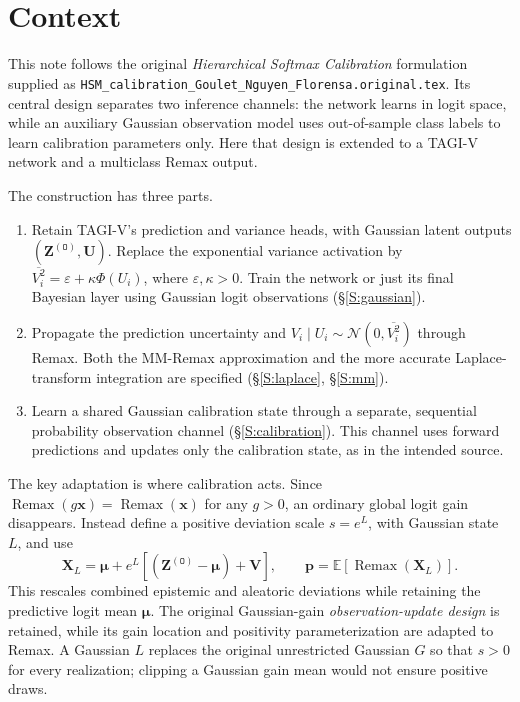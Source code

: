 \documentclass[letterpaper]{article}
\newcommand{\E}{\mathbb E}
\newcommand{\Normal}{\mathcal N}
\newcommand{\Remax}{\operatorname{Remax}}
\newcommand{\vbari}{\overline{V_i^2}}
\newcommand{\given}{\mid}
\newcommand{\titleS}{~}
\begin{document}
\title{\titleS}
\section{Context}\label{S:scope}
This note follows the original \emph{Hierarchical Softmax Calibration} formulation supplied as \nolinkurl{HSM_calibration_Goulet_Nguyen_Florensa.original.tex}. Its central design separates two inference channels: the network learns in logit space, while an auxiliary Gaussian observation model uses out-of-sample class labels to learn calibration parameters only. Here that design is extended to a TAGI-V network and a multiclass Remax output.

The construction has three parts.
\begin{enumerate}
\item Retain TAGI-V's prediction and variance heads, with Gaussian latent outputs $(\bm Z^{(\mathtt O)},\bm U)$. Replace the exponential variance activation by $\vbari=\varepsilon+\kappa\Phi(U_i)$, where $\varepsilon,\kappa>0$. Train the network or just its final Bayesian layer using Gaussian logit observations (\S\ref{S:gaussian}).
\item Propagate the prediction uncertainty and $V_i\given U_i\sim\Normal(0,\vbari)$ through Remax. Both the MM-Remax approximation and the more accurate Laplace-transform integration are specified (\S\ref{S:laplace}, \S\ref{S:mm}).
\item Learn a shared Gaussian calibration state through a separate, sequential probability observation channel (\S\ref{S:calibration}). This channel uses forward predictions and updates only the calibration state, as in the intended source.
\end{enumerate}
The key adaptation is where calibration acts. Since $\Remax(g\bm x)=\Remax(\bm x)$ for any $g>0$, an ordinary global logit gain disappears. Instead define a positive deviation scale $s=e^L$, with Gaussian state $L$, and use
\begin{equation}
\boxed{\bm X_L=\bm\mu+e^L[(\bm Z^{(\mathtt O)}-\bm\mu)+\bm V],\qquad
\bm p=\E[\Remax(\bm X_L)].}
\label{E:contextmodel}
\end{equation}
This rescales combined epistemic and aleatoric deviations while retaining the predictive logit mean $\bm\mu$. The original Gaussian-gain \emph{observation-update design} is retained, while its gain location and positivity parameterization are adapted to Remax. A Gaussian $L$ replaces the original unrestricted Gaussian $G$ so that $s>0$ for every realization; clipping a Gaussian gain mean would not ensure positive draws.
\end{document}
